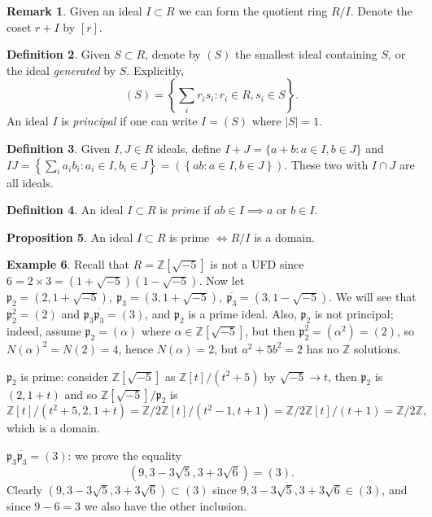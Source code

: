 \documentclass{article}
\newcommand{\Z}{\mathbb{Z}}
\newcommand{\ip}{\mathfrak{p}}
\theoremstyle{definition}
\newtheorem{defn}{Definition}[subsection]
\newtheorem{prop}[defn]{Proposition}
\newtheorem{example}[defn]{Example}
\newtheorem{remark}[defn]{Remark}
\begin{document}
\begin{remark}
Given an ideal $I\subset R$ we can form the quotient ring $R/I$. Denote the coset $r+I$ by $[r]$.
\end{remark}

\begin{defn}
Given $S\subset R$, denote by $(S)$ the smallest ideal containing $S$, or the ideal \textit{generated} by $S$. Explicitly,
\[
(S)=\left\{\sum_i r_is_i:r_i\in R,s_i\in S\right\}.
\]
An ideal $I$ is \textit{principal} if one can write $I=(S)$ where $|S|=1$.
\end{defn}

\begin{defn}
Given $I,J\in R$ ideals, define $I+J=\{a+b:a\in I,b\in J\}$ and $IJ=\left\{\sum_i a_ib_i:a_i\in I,b_i\in J\right\}=\left(\left\{ab:a\in I,b\in J\right\}\right)$. These two with $I\cap J$ are all ideals. 
\end{defn}

\begin{defn}
An ideal $I\subset R$ is \textit{prime} if $ab\in I\implies a$ or $b\in I$.
\end{defn}

\begin{prop}
An ideal $I\subset R$ is prime $\iff R/I$ is a domain.
\end{prop}

\begin{example}
Recall that $R=\Z\left[\sqrt{-5}\right]$ is not a UFD since $6=2\times 3=\left(1+\sqrt{-5}\right)\left(1-\sqrt{-5}\right)$. Now let $\ip_2=\left(2,1+\sqrt{-5}\right),\ \ip_3=\left(3,1+\sqrt{-5}\right),\ \overline{\ip_3}=\left(3,1-\sqrt{-5}\right)$. We will see that $\ip_2^2=(2)$ and $\ip_3\overline{\ip_3}=(3)$, and $\ip_2$ is a prime ideal. Also, $\ip_2$ is not principal; indeed, assume $\ip_2=(\alpha)$ where $\alpha\in\Z\left[\sqrt{-5}\right]$, but then $\ip_2^2=(\alpha^2)=(2)$, so $N(\alpha)^2=N(2)=4$, hence $N(\alpha)=2$, but $a^2+5b^2=2$ has no $\Z$ solutions.

$\ip_2$ is prime: consider $\Z\left[\sqrt{-5}\right]$ as $\Z[t]/(t^2+5)$ by $\sqrt{-5}\rightarrow t$, then $\ip_2$ is $(2,1+t)$ and so $\Z\left[\sqrt{-5}\right]/\ip_2$ is
\[
\Z[t]/(t^2+5,2,1+t)=\Z/2\Z[t]/(t^2-1,t+1)=\Z/2\Z[t]/(t+1)=\Z/2\Z,
\]
which is a domain.

$\ip_3\overline{\ip_3}=(3)$: we prove the equality
\[
\left(9,3-3\sqrt 5,3+3\sqrt 6\right)=(3).
\]
Clearly $\left(9,3-3\sqrt 5,3+3\sqrt 6\right)\subset (3)$ since $9,3-3\sqrt 5,3+3\sqrt 6\in (3)$, and since $9-6=3$ we also have the other inclusion.
\end{example}
\end{document}

